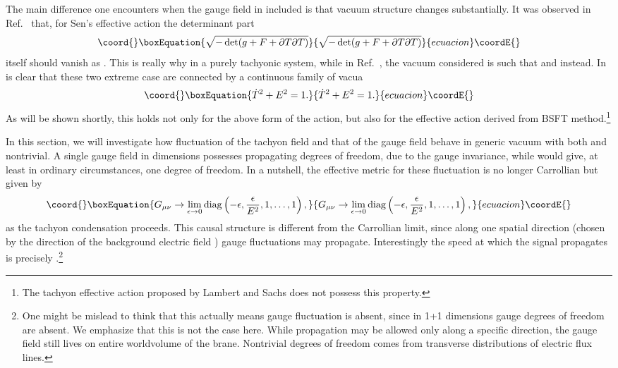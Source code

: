 \documentclass[a4paper,12pt]{article}
\providecommand{\p}{\partial}
\begin{document}
The main difference one encounters when the gauge field in included
is that vacuum structure changes substantially. It was observed in 
Ref.~\cite{fluid} that, for Sen's effective action
the determinant part 
\begin{equation}\coord{}\boxEquation{
\sqrt{-  \det (g + F +\p T\p T)} 
}{
\sqrt{-  \det (g + F +\p T\p T)} 
}{ecuacion}\coordE{}\end{equation}
itself should vanish as \coordHE{}. This is really why 
\coordHE{} in a purely tachyonic system, while in Ref.~\cite{fluid}, 
the vacuum considered is such that \coordHE{} and \coordHE{} instead.
In is clear that these two extreme case are connected by a continuous 
family of vacua
\begin{equation}\coord{}\boxEquation{
\dot T^2+E^2 = 1. \label{1}
}{
\dot T^2+E^2 = 1. }{ecuacion}\coordE{}\end{equation}
As will be shown shortly, this holds not only for the above
form of the action, but also for the effective action derived from BSFT
method.\footnote{The tachyon effective action proposed by 
Lambert and Sachs \cite{LS} does not possess this property. } 

In this section, we will investigate how fluctuation of the 
tachyon field and that of the gauge field behave in generic 
vacuum with both \coordHE{} and \coordHE{} nontrivial. A single gauge
field in \coordHE{} dimensions possesses \coordHE{} propagating degrees
of freedom, due to the gauge invariance, while \coordHE{} would give,
at least in ordinary circumstances, one degree of freedom.
In a nutshell, the effective metric for these \coordHE{}
fluctuation is no longer Carrollian but given by 
\begin{equation}\coord{}\boxEquation{
G_{\mu \nu} \rightarrow \lim_{\epsilon\rightarrow 0} {\rm diag }
\left(-\epsilon,\frac{\epsilon}{E^2},1, \dots, 1 \right),
\label{difca}
}{
G_{\mu \nu} \rightarrow \lim_{\epsilon\rightarrow 0} {\rm diag }
\left(-\epsilon,\frac{\epsilon}{E^2},1, \dots, 1 \right),
}{ecuacion}\coordE{}\end{equation} 
as the tachyon condensation proceeds. This causal structure is different
from the Carrollian limit, since along one spatial direction (chosen by
the direction of the background electric field \coordHE{}) gauge fluctuations
may propagate. Interestingly the speed at which the signal propagates 
is precisely \coordHE{}.\footnote{ One might be mislead to think that this
actually means gauge fluctuation is absent, since  in 1+1 dimensions
gauge degrees of freedom are absent. We emphasize that this is not the
case here. While propagation may be allowed only along a specific
direction, the gauge field still lives on entire worldvolume of the
brane. Nontrivial degrees of freedom comes from transverse distributions
of electric flux lines.}
\end{document}
